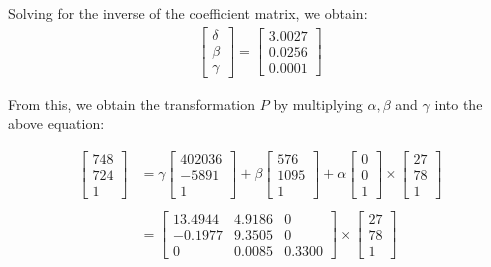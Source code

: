 \documentclass[12pt, oneside]{article}
\begin{document}
Solving for the inverse of the coefficient matrix, we obtain:
\begin{align*}
\begin{bmatrix}
\delta \\
\beta \\
\gamma
\end{bmatrix} = 
\begin{bmatrix}
3.0027    \\
0.0256   \\
0.0001
\end{bmatrix} 
\end{align*}
  
From this, we obtain the transformation $P$ by multiplying $\alpha, \beta$ and $\gamma$ into the above equation:

\begin{align*}
    \begin{bmatrix} 748   \\ 724   \\ 1   \end{bmatrix}  &= 
    \gamma  \begin{bmatrix} 402036  \\ -5891 \\ 1  \end{bmatrix} + 
    \beta \begin{bmatrix} 576   \\ 1095   \\   1   \end{bmatrix} + 
    \alpha \begin{bmatrix} 0   \\ 0   \\   1   \end{bmatrix} \times 
    \begin{bmatrix} 27 \\ 78 \\ 1  \end{bmatrix} \\ \\
    &= \begin{bmatrix}
    13.4944     &  4.9186   & 0 \\
    -0.1977     &  9.3505   & 0 \\
    0           & 0.0085  & 0.3300
    \end{bmatrix} \times 
    \begin{bmatrix} 27 \\ 78 \\ 1  \end{bmatrix} \\
\end{align*} 
\end{document}
